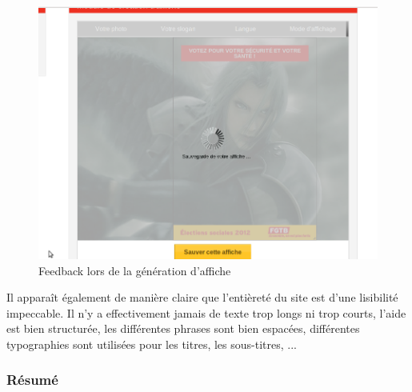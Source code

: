 \documentclass{article}
\begin{document}
\begin{sffamily}
\begin{figure}[h!]
	\begin{center}
		\includegraphics[scale=0.3]{ergo_005.png}
		\caption{Feedback lors de la génération d'affiche}
	\end{center}
\end{figure}

Il apparaît également de manière claire que l'entièreté du site est d'une lisibilité impeccable. Il n'y a effectivement jamais de texte trop longs 
ni trop courts, l'aide est bien structurée, les différentes phrases sont bien espacées, différentes typographies sont utilisées pour les titres, 
les sous-titres, ... \\

\subsubsection*{Résumé}


\end{sffamily}
\end{document}
